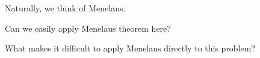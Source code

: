 












Naturally, we think of Menelaus.

Can we easily apply Menelaus theorem here?








What makes it difficult to apply Menelaus directly to this problem?


